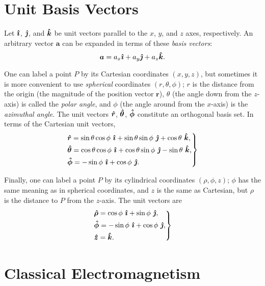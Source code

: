 \documentclass{article}
\numberwithin{equation}{section}
\begin{document}
\section{Unit Basis Vectors}

Let $\bm{\hat{\imath}}$, $\bm{\hat{\jmath}}$, and $\bm{\hat{k}}$ be unit vectors parallel to the $x$, $y$, and $z$ axes, respectively. An arbitrary vector $\bm{a}$ can be expanded in terms of these \emph{basis vectors}:
\begin{equation}
    \bm{a} = a_x \bm{\hat{\imath}} + a_y \bm{\hat{\jmath}} + a_z \bm{\hat{k}}.
\end{equation}

One can label a point $P$ by its Cartesian coordinates $(x, y, z)$, but sometimes it is more convenient to use \emph{spherical} coordinates $(r, \theta, \phi)$; $r$ is the distance from the origin (the magnitude of the position vector $\bm{r}$), $\theta$ (the angle down from the $z$-axis) is called the \emph{polar angle}, and $\phi$ (the angle around from the $x$-axis) is the \emph{azimuthal angle}. The unit vectors $\bm{\hat{r}}$, $\bm{\hat{\theta}}$, $\bm{\hat{\phi}}$ constitute an orthogonal basis set. In terms of the Cartesian unit vectors,
\begin{equation}
    \begin{rcases} \displaystyle \bm{\hat{r}} = \sin{\theta}\cos{\phi}\ \bm{\hat{\imath}} + \sin{\theta}\sin{\phi}\ \bm{\hat{\jmath}} + \cos{\theta}\ \bm{\hat{k}}, \\ \displaystyle \bm{\hat{\theta}} = \cos{\theta}\cos{\phi}\ \bm{\hat{\imath}} + \cos{\theta}\sin{\phi}\ \bm{\hat{\jmath}} - \sin{\theta}\ \bm{\hat{k}}, \\ \displaystyle \bm{\hat{\phi}} = -\sin{\phi}\ \bm{\hat{\imath}} + \cos{\phi}\ \bm{\hat{\jmath}}. \end{rcases}
\end{equation}

Finally, one can label a point $P$ by its cylindrical coordinates $(\rho, \phi, z)$; $\phi$ has the same meaning as in spherical coordinates, and $z$ is the same as Cartesian, but $\rho$ is the distance to $P$ from the $z$-axis. The unit vectors are
\begin{equation}
    \begin{rcases} \displaystyle \bm{\hat{\rho}} = \cos{\phi}\ \bm{\hat{\imath}} + \sin{\phi}\ \bm{\hat{\jmath}}, \\ \displaystyle \bm{\hat{\phi}} = -\sin{\phi}\ \bm{\hat{\imath}} + \cos{\phi}\ \bm{\hat{\jmath}}, \\ \displaystyle \bm{\hat{z}} = \bm{\hat{k}}. \end{rcases}
\end{equation}

\section{Classical Electromagnetism}
\end{document}
